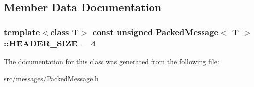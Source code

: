 \subsection{Member Data Documentation}
\subsubsection[{\texorpdfstring{H\+E\+A\+D\+E\+R\+\_\+\+S\+I\+ZE}{HEADER_SIZE}}]{\setlength{\rightskip}{0pt plus 5cm}template$<$class T$>$ const unsigned {\bf Packed\+Message}$<$ T $>$\+::H\+E\+A\+D\+E\+R\+\_\+\+S\+I\+ZE = 4\hspace{0.3cm}{\ttfamily [static]}}\hypertarget{class_packed_message_a487152563442f0225bffb9e0402cd94e}{}\label{class_packed_message_a487152563442f0225bffb9e0402cd94e}


The documentation for this class was generated from the following file\+:\begin{DoxyCompactItemize}
\item 
src/messages/\hyperlink{_packed_message_8h}{Packed\+Message.\+h}\end{DoxyCompactItemize}
